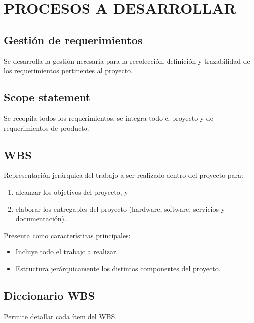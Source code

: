 \chapter{PROCESOS A DESARROLLAR}
%
\section{Gesti\'on de requerimientos}
Se desarrolla la gesti\'on necesaria para la recolecci\'on, definici\'on y trazabilidad
de los requerimientos pertinentes al proyecto.
%
\section{Scope statement}
Se recopila todos los requerimientos, se integra todo el proyecto y de requerimientos de producto.
%
\section{WBS}
Representaci\'on jer\'arquica del trabajo a ser realizado dentro del proyecto para: 
\begin{enumerate}
	\item alcanzar los objetivos del proyecto, y
	\item elaborar los entregables del proyecto (hardware, software, servicios y documentaci\'on).
\end{enumerate}
%
Presenta como caracter\'isticas principales:
\begin{itemize}
	\item Incluye todo el trabajo a realizar.
	\item Estructura jer\'arquicamente los distintos componentes del proyecto.
\end{itemize}
%
\section{Diccionario WBS}
Permite detallar cada \'item del WBS.